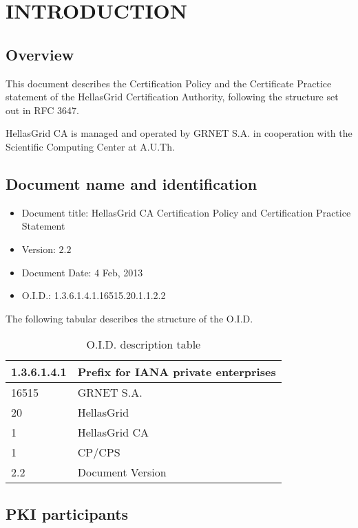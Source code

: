 
\chapter{INTRODUCTION}
\section{Overview}

This document describes the Certification Policy and the Certificate Practice statement of the HellasGrid Certification Authority, following the structure set out in RFC 3647. 

HellasGrid CA is managed and operated by GRNET S.A. in cooperation with the Scientific Computing Center at A.U.Th.

\section{Document name and identification}
\label{sec:DocumentNameAndIdentification}

\begin{itemize}
\item{Document title: HellasGrid CA Certification Policy and Certification Practice Statement}
\item{Version: $2.2$}
\item{Document Date: 4 Feb, 2013}
\item{O.I.D.: 1.3.6.1.4.1.16515.20.1.1.2.2}
\end{itemize}
The following tabular describes the structure of the O.I.D.

\begin{table}[hbt]
\begin{center}
\begin{tabular}{|l|l|}
\hline
1.3.6.1.4.1 & Prefix for IANA private enterprises \\
\hline
16515 & GRNET S.A. \\
\hline
20 & HellasGrid \\
\hline
1 & HellasGrid CA \\
\hline
1 & CP/CPS \\
\hline
2.2 & Document Version \\
\hline
\end{tabular}
\end{center}
\caption{O.I.D. description table}
\end{table}

\section{PKI participants}

